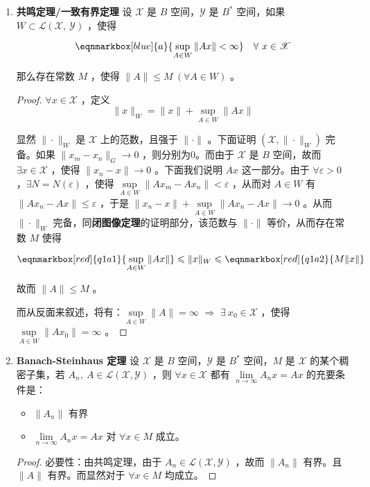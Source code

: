 \begin{enumerate}[leftmargin=2cm, label=\arabic*]
\begin{proof}
即我们的目的说明了 $T$ 是有界算子，故而 $T$ 是连续的。
\end{proof}
    \item \textbf{共鸣定理/一致有界定理} 设 $\mathscr{X}$ 是 $B$ 空间，$\mathscr{Y}$ 是 $B^*$ 空间，如果 $W\subset\mathscr{L}(\mathscr{X},\ \mathscr{Y})$ ，使得
    
\begin{equation}
    \eqnmarkbox[blue]{a}{\sup\limits_{A\in W} \|Ax\| < \infty} \quad \forall\ x\in \mathscr{X} \nonumber
\end{equation}

那么存在常数 $M$ ，使得 $\|A\|\leqslant M\ (\forall A\in W)$ 。
\begin{proof}
    $\forall x\in\mathscr{X}$ ，定义
\begin{equation*}
    \|x\|_W = \|x\| + \sup\limits_{A\in W} \|Ax\|
\end{equation*}

显然 $\|\cdot\|_W$ 是 $\mathscr{X}$ 上的范数，且强于 $\|\cdot\|$ 。下面证明 $(\mathscr{X},\|\cdot\|_W)$ 完备。如果 $\|x_m - x_n\|_G\to 0$ ，则分别为0。而由于 $\mathscr{X}$ 是 $B$ 空间，故而 $\exists x\in\mathscr{X}$ ，使得 $\|x_n - x\|\to 0$ 。下面我们说明 $Ax$ 这一部分。由于 $\forall\varepsilon > 0$ ，$\exists N= N(\varepsilon)$ ，使得 $\sup\limits_{A\in W} \|Ax_m - Ax_n\| < \varepsilon$ ，从而对 $A\in W$ 有 $\|Ax_n - Ax\|\leqslant \varepsilon$ ，于是 $\|x_n - x\| + \sup\limits_{A\in W}\|Ax_n - Ax\| \to 0$ 。从而 $\|\cdot\|_W$ 完备，同\textbf{闭图像定理}的证明部分，该范数与 $\|\cdot\|$ 等价，从而存在常数 $M$ 使得

\begin{equation*}
    \eqnmarkbox[red]{q1a1}{\sup\limits_{A\in W}\|Ax\|} \leqslant \|x\|_W \leqslant \eqnmarkbox[red]{q1a2}{M\|x\|}
\end{equation*}

故而 $\|A\| \leqslant M$ 。

    而从反面来叙述，将有：$\sup\limits_{A\in W} \|A\| =\infty$ $\Longrightarrow$ $\exists\ x_0\in\mathscr{X}$ ，使得 $\sup\limits_{A\in W} \|Ax_0\| = \infty$ 。
\end{proof}
    \item \textbf{Banach-Steinhaus 定理} 设 $\mathscr{X}$ 是 $B$ 空间，$\mathscr{Y}$ 是 $B^*$ 空间，$M$ 是 $\mathscr{X}$ 的某个稠密子集，若 $A_n,\ A\in\mathscr{L}(\mathscr{X},\mathscr{Y})$ ，则 $\forall x\in\mathscr{X}$ 都有 $\lim\limits_{n\to\infty} A_n x = Ax$ 的充要条件是：
\begin{itemize}
    \item $\|A_n\|$ 有界
    \item $\lim\limits_{n\to\infty} A_n x = Ax$ 对 $\forall x\in M$ 成立。
\end{itemize}
\begin{proof}
    必要性：由共鸣定理，由于 $A_n\in\mathscr{L}(\mathscr{X},\mathscr{Y})$ ，故而 $\|A_n\|$ 有界。且 $\|A\|$ 有界。而显然对于 $\forall x\in M$ 均成立。


\end{proof}
\end{enumerate}
